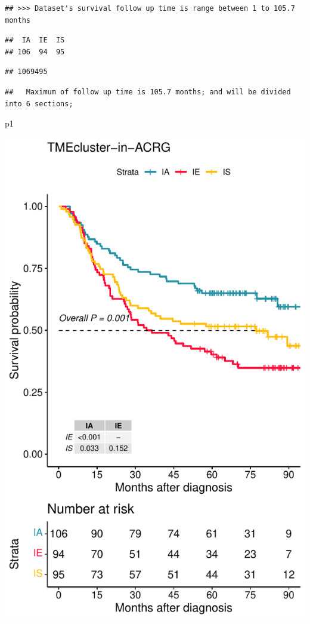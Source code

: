\documentclass[
  12pt,
]{book}
\newenvironment{Shaded}{\begin{snugshade}}{\end{snugshade}}
\newcommand{\NormalTok}[1]{#1}
\theoremstyle{definition}
\theoremstyle{definition}
\theoremstyle{definition}
\theoremstyle{definition}
\theoremstyle{remark}
\begin{document}
\begin{verbatim}
## >>> Dataset's survival follow up time is range between 1 to 105.7 months
\end{verbatim}

\begin{verbatim}
##  IA  IE  IS 
## 106  94  95
\end{verbatim}

\begin{verbatim}
## 1069495
\end{verbatim}

\begin{verbatim}
##   Maximum of follow up time is 105.7 months; and will be divided into 6 sections;
\end{verbatim}

\begin{Shaded}
\begin{Highlighting}[]
\NormalTok{p1}
\end{Highlighting}
\end{Shaded}

\includegraphics{_main_files/figure-latex/unnamed-chunk-30-1.pdf}
\end{document}

